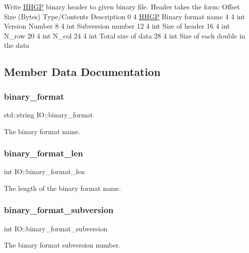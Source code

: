 Write \hyperlink{class_h_h_g_p}{H\+H\+GP} binary header to given binary file. Header takes the form\+: Offset Size (Bytes) Type/\+Contents Description 0 4 \textquotesingle{}\hyperlink{class_h_h_g_p}{H\+H\+GP}\textquotesingle{} Binary format name 4 4 int Version Number 8 4 int Subversion number 12 4 int Size of header 16 4 int N\+\_\+row 20 4 int N\+\_\+col 24 4 int Total size of data 28 4 int Size of each double in the data

\subsection{Member Data Documentation}
\mbox{\label{class_i_o_a254c13a437051a09be72f77173017576}} 
\subsubsection{\texorpdfstring{binary\+\_\+format}{binary\_format}}
{\footnotesize\ttfamily std\+::string I\+O\+::binary\+\_\+format}

The binary format name. \mbox{\label{class_i_o_a2a1699a4cde1ce8631ae0309bc75d336}} 
\subsubsection{\texorpdfstring{binary\+\_\+format\+\_\+len}{binary\_format\_len}}
{\footnotesize\ttfamily int I\+O\+::binary\+\_\+format\+\_\+len}

The length of the binary format name. \mbox{\label{class_i_o_ad5c0c344b35565bb355c5d714121787b}} 
\subsubsection{\texorpdfstring{binary\+\_\+format\+\_\+subversion}{binary\_format\_subversion}}
{\footnotesize\ttfamily int I\+O\+::binary\+\_\+format\+\_\+subversion}

The binary format subversion number. \mbox{\label{class_i_o_aaf91ba1d8be1503b44b2b1b1b666303b}} 
